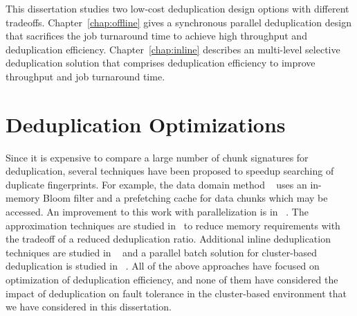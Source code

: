 This dissertation studies two low-cost deduplication design options with different tradeoffs. 
Chapter~\ref{chap:offline} gives a synchronous parallel deduplication design that
sacrifices the job turnaround time to achieve high throughput and deduplication efficiency.
Chapter~\ref{chap:inline} describes an multi-level selective deduplication solution
that comprises deduplication efficiency to improve throughput and job turnaround time.

\section{Deduplication Optimizations}
\label{back:algo}
Since it is expensive to compare a large number of chunk signatures for deduplication,
several techniques have been proposed to speedup searching of duplicate
fingerprints. For example, the data domain method ~\cite{bottleneck08} 
uses  an in-memory Bloom filter and a prefetching cache for data chunks  which may be
accessed.  An improvement to this work with parallelization is in ~\cite{MAD210,DEBAR}.
The approximation techniques are studied in~\cite{extreme_binning09,Guo2011,WeiZhangIEEE}  
to reduce memory requirements with the tradeoff of a reduced deduplication ratio.
Additional inline deduplication techniques are studied in ~\cite{sparseindex09,Guo2011,Srinivasan2012}
and a parallel batch solution for cluster-based deduplication is 
studied in ~\cite{wei2013}. 
All of the above approaches have focused on optimization of deduplication
efficiency, and none of them have considered the impact
of deduplication on fault tolerance in the cluster-based environment that we have considered
in this dissertation.
